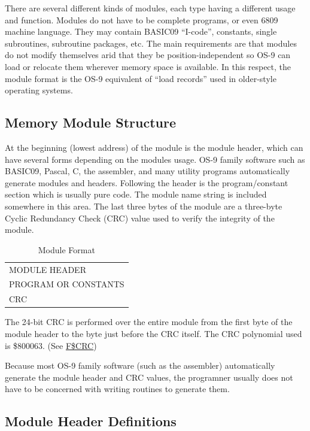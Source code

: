 \documentclass[
]{article}
\begin{document}
There are several different kinds of modules, each type having a
different usage and function. Modules do not have to be complete
programs, or even 6809 machine language. They may contain BASIC09
``I-code'', constants, single subroutines, subroutine packages, etc. The
main requirements are that modules do not modify themselves arid that
they be position-independent so OS-9 can load or relocate them wherever
memory space is available. In this respect, the module format is the
OS-9 equivalent of ``load records'' used in older-style operating
systems.

\subsection{Memory Module Structure}

At the beginning (lowest address) of the module is the module header,
which can have several forms depending on the module\textquotesingle s
usage. OS-9 family software such as BASIC09, Pascal, C, the assembler,
and many utility programs automatically generate modules and headers.
Following the header is the program/constant section which is usually
pure code. The module name string is included somewhere in this area.
The last three bytes of the module are a three-byte Cyclic Redundancy
Check (CRC) value used to verify the integrity of the module.

\begin{longtable}[]{@{}
  >{\raggedright\arraybackslash}p{}@{}}
\caption{Module Format}\tabularnewline
\toprule\noalign{}
\endfirsthead
\endhead
\bottomrule\noalign{}
\endlastfoot
MODULE HEADER \\
PROGRAM OR CONSTANTS \\
CRC \\
\end{longtable}

The 24-bit CRC is performed over the entire module from the first byte
of the module header to the byte just before the CRC itself. The CRC
polynomial used is \$800063. (See \hyperref[f.crc]{F\$CRC})

Because most OS-9 family software (such as the assembler) automatically
generate the module header and CRC values, the programner usually does
not have to be concerned with writing routines to generate them.

\subsection{Module Header Definitions}
\end{document}
